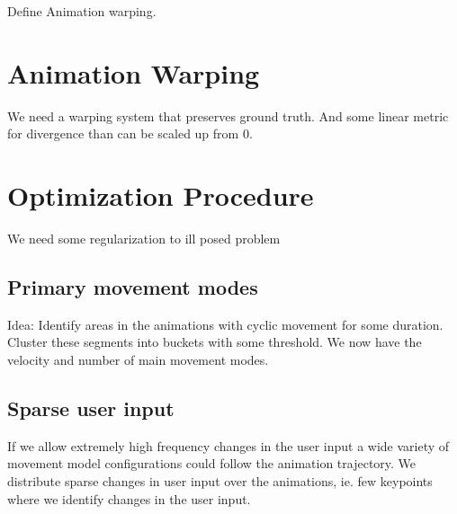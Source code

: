Define Animation warping.


\section{Animation Warping}
We need a warping system that preserves ground truth. And some linear metric for divergence than can be scaled up from 0.


\section{Optimization Procedure}
We need some regularization to ill posed problem
\subsection{Primary movement modes}
Idea: Identify areas in the animations with cyclic movement for some duration. Cluster these segments into buckets with some threshold. We now have the velocity and number of main movement modes.
\subsection{Sparse user input}
If we allow extremely high frequency changes in the user input a wide variety of movement model configurations could follow the animation trajectory. We distribute sparse changes in user input over the animations, ie. few keypoints where we identify changes in the user input.



